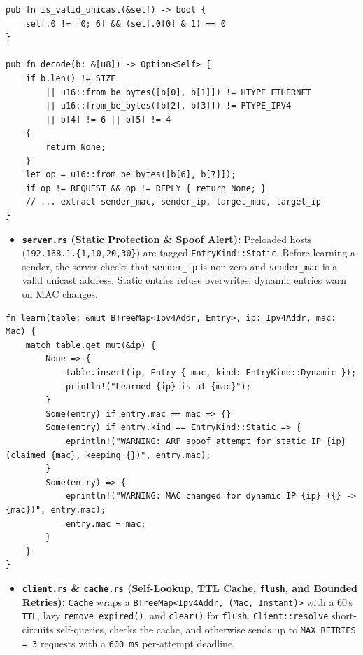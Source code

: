 \documentclass[11pt,a4paper]{article}
\begin{document}
\begin{lstlisting}[caption={Strict packet decoding and unicast MAC check in \texttt{arp/src/packet.rs}.}]
pub fn is_valid_unicast(&self) -> bool {
    self.0 != [0; 6] && (self.0[0] & 1) == 0
}

pub fn decode(b: &[u8]) -> Option<Self> {
    if b.len() != SIZE
        || u16::from_be_bytes([b[0], b[1]]) != HTYPE_ETHERNET
        || u16::from_be_bytes([b[2], b[3]]) != PTYPE_IPV4
        || b[4] != 6 || b[5] != 4
    {
        return None;
    }
    let op = u16::from_be_bytes([b[6], b[7]]);
    if op != REQUEST && op != REPLY { return None; }
    // ... extract sender_mac, sender_ip, target_mac, target_ip
}
\end{lstlisting}

\begin{itemize}
  \item \textbf{\texttt{server.rs} (Static Protection \& Spoof Alert):} Preloaded hosts (\texttt{192.168.1.\{1,10,20,30\}}) are tagged \texttt{EntryKind::Static}. Before learning a sender, the server checks that \texttt{sender\_ip} is non-zero and \texttt{sender\_mac} is a valid unicast address. Static entries refuse overwrites; dynamic entries warn on MAC changes.
\end{itemize}

\begin{lstlisting}[caption={Static-entry protection and MAC-change alerting in \texttt{arp/src/server.rs}.}]
fn learn(table: &mut BTreeMap<Ipv4Addr, Entry>, ip: Ipv4Addr, mac: Mac) {
    match table.get_mut(&ip) {
        None => {
            table.insert(ip, Entry { mac, kind: EntryKind::Dynamic });
            println!("Learned {ip} is at {mac}");
        }
        Some(entry) if entry.mac == mac => {}
        Some(entry) if entry.kind == EntryKind::Static => {
            eprintln!("WARNING: ARP spoof attempt for static IP {ip} (claimed {mac}, keeping {})", entry.mac);
        }
        Some(entry) => {
            eprintln!("WARNING: MAC changed for dynamic IP {ip} ({} -> {mac})", entry.mac);
            entry.mac = mac;
        }
    }
}
\end{lstlisting}

\begin{itemize}
  \item \textbf{\texttt{client.rs} \& \texttt{cache.rs} (Self-Lookup, TTL Cache, \texttt{flush}, and Bounded Retries):} \texttt{Cache} wraps a \texttt{BTreeMap<Ipv4Addr, (Mac, Instant)>} with a 60\,s \texttt{TTL}, lazy \texttt{remove\_expired()}, and \texttt{clear()} for \texttt{flush}. \texttt{Client::resolve} short-circuits self-queries, checks the cache, and otherwise sends up to \texttt{MAX\_RETRIES = 3} requests with a \texttt{600\,ms} per-attempt deadline.
\end{itemize}
\end{document}
